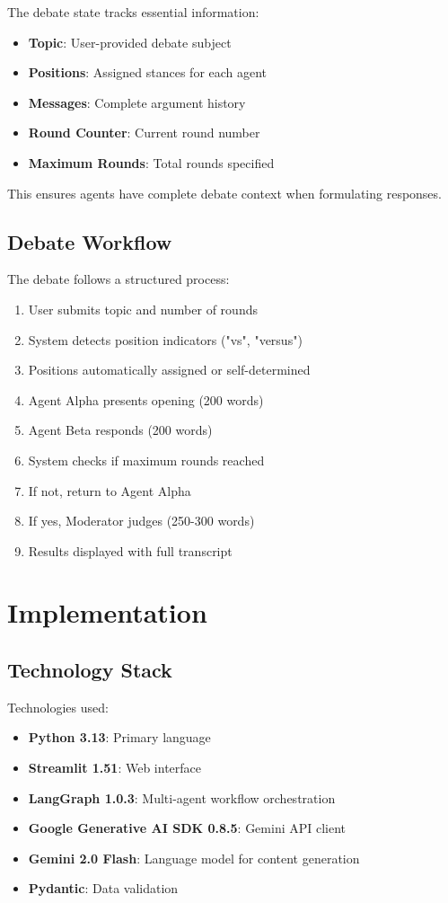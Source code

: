 \documentclass[conference]{IEEEtran}
\begin{document}
The debate state tracks essential information:
\begin{itemize}
\item \textbf{Topic}: User-provided debate subject
\item \textbf{Positions}: Assigned stances for each agent
\item \textbf{Messages}: Complete argument history
\item \textbf{Round Counter}: Current round number
\item \textbf{Maximum Rounds}: Total rounds specified
\end{itemize}

This ensures agents have complete debate context when formulating responses.

\subsection{Debate Workflow}

The debate follows a structured process:
\begin{enumerate}
\item User submits topic and number of rounds
\item System detects position indicators ("vs", "versus")
\item Positions automatically assigned or self-determined
\item Agent Alpha presents opening (200 words)
\item Agent Beta responds (200 words)
\item System checks if maximum rounds reached
\item If not, return to Agent Alpha
\item If yes, Moderator judges (250-300 words)
\item Results displayed with full transcript
\end{enumerate}

\section{Implementation}

\subsection{Technology Stack}

Technologies used:
\begin{itemize}
\item \textbf{Python 3.13}: Primary language
\item \textbf{Streamlit 1.51}: Web interface
\item \textbf{LangGraph 1.0.3}: Multi-agent workflow orchestration
\item \textbf{Google Generative AI SDK 0.8.5}: Gemini API client
\item \textbf{Gemini 2.0 Flash}: Language model for content generation
\item \textbf{Pydantic}: Data validation
\end{itemize}
\end{document}
